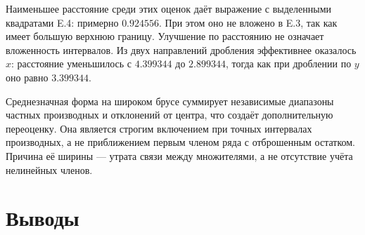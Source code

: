 \documentclass[12pt,a4paper]{article}
\begin{document}
Наименьшее расстояние среди этих оценок даёт выражение
с выделенными квадратами E.4: примерно $0.924556$.
При этом оно не вложено в E.3, так как имеет большую верхнюю границу.
Улучшение по расстоянию не означает вложенность интервалов.
Из двух направлений дробления эффективнее оказалось $x$:
расстояние уменьшилось с $4.399344$ до $2.899344$,
тогда как при дроблении по $y$ оно равно $3.399344$.

Среднезначная форма на широком брусе суммирует независимые
диапазоны частных производных и отклонений от центра, что создаёт
дополнительную переоценку. Она является строгим включением при
точных интервалах производных, а не приближением первым членом
ряда с отброшенным остатком. Причина её ширины --- утрата связи
между множителями, а не отсутствие учёта нелинейных членов.

\section*{Выводы}
\end{document}
